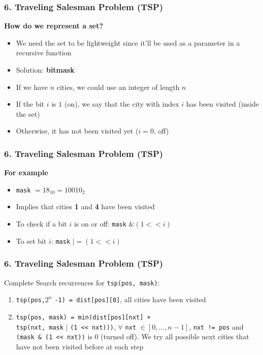 \documentclass{beamer}
\begin{document}
\begin{frame}[fragile]
\frametitle{6. Traveling Salesman Problem (TSP)}

\textbf{How do we represent a set?}

\vspace{0.3cm}

\begin{itemize}
    \item We need the set to be lightweight since it'll be used as a parameter in a recursive function
    \pause
    \item Solution: \textbf{bitmask}
    \item If we have $n$ cities, we could use an integer of length $n$
    \pause
    \item If the bit $i$ is $1$ (on), we say that the city with index $i$ has been visited (inside the set)
    \item Otherwise, it has not been visited yet ($i=0$, off)
\end{itemize}

\end{frame}

\begin{frame}[fragile]
\frametitle{6. Traveling Salesman Problem (TSP)}

\textbf{For example} 

\vspace{0.3cm}

\begin{itemize}
    \item \verb|mask| $ = 18_{10} = 10010_2$
    \item Implies that cities \textbf{1} and \textbf{4} have been visited
    \item To check if a bit $i$ is on or off: \verb|mask| $\& (1 << i)$
    \item To set bit $i$: \verb|mask| $|= (1 << i)$
\end{itemize}

\end{frame}

\begin{frame}[fragile]
\frametitle{6. Traveling Salesman Problem (TSP)}

Complete Search recurrences for \verb|tsp(pos, mask)|:

\begin{enumerate}
    \item \color{blue}\verb|tsp(pos,|$2^n$ \verb|-1) = dist[pos][0]|\color{black}, all cities have been visited
    \item \color{blue} \verb|tsp(pos, mask) = min(dist[pos][nxt] +| \\ \verb|tsp(nxt, mask| $|$ \verb|(1 << nxt)))|\color{black}, $\forall$ \verb|nxt| $\in [0,\ldots,n-1]$, \verb|nxt != pos| and \verb|(mask & (1 << nxt))| is $0$ (turned off). We try all possible next cities that have not been visited before at each step
\end{enumerate}

\end{frame}
\end{document}
